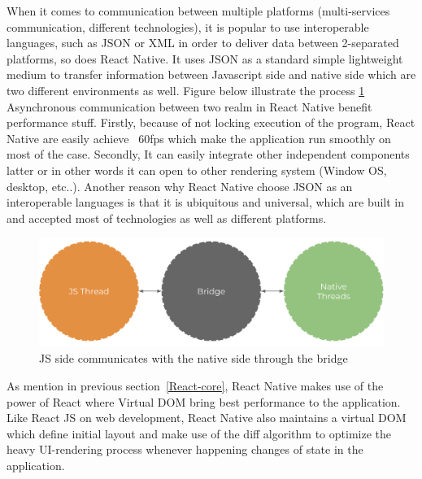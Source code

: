 	
When it comes to communication between multiple platforms (multi-services communication, different technologies), it is popular to use interoperable languages, such as JSON or XML in order to deliver data between 2-separated platforms, so does React Native. It uses JSON as a standard simple lightweight medium to transfer information between Javascript side and native side which are two different environments as well. Figure below illustrate the process \ref{fig:RN-communication-JSON}\\
Asynchronous communication between two realm in React Native benefit performance stuff. Firstly, because of not locking execution of the program, React Native are easily achieve ~60fps which make the application run smoothly on most of the case. Secondly, It can easily integrate other independent components latter or in other words it can open to other rendering system (Window OS, desktop, etc..). Another reason why React Native choose JSON as an interoperable languages is that it is ubiquitous and universal, which are built in and accepted most of technologies as well as different platforms.\\

\begin{figure}[!h]
		\centering
		\includegraphics[scale=0.2]{Picture/mobile/communication-bridge.png}
		\caption{JS side communicates with the native side through the bridge}
	\label{fig:RN-communication-JSON}
\end{figure}
	


As mention in previous section~\ref{React-core}, React Native makes use of the power of React where Virtual DOM bring best performance to the application. Like React JS on web development, React Native also maintains a virtual DOM which define initial layout and make use of the diff algorithm to optimize the heavy UI-rendering process whenever happening changes of state in the application.\\ 
	
